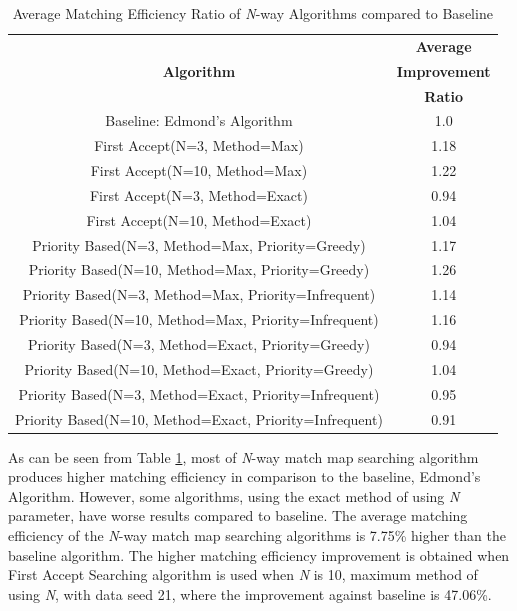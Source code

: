 \documentclass[conference]{IEEEtran}
\begin{document}
\begin{table}[htbp]
    \caption{Average Matching Efficiency Ratio of \textit{N}-way Algorithms compared to Baseline}
    \begin{center}
    \def\arraystretch{1.5}
    \begin{tabular}{|c|c|}
    \hline
    \cellcolor{tableheader}&\cellcolor{tableheader}\textbf{Average} \\
    \cellcolor{tableheader}\textbf{Algorithm}&\cellcolor{tableheader}\textbf{Improvement}\\
    \cellcolor{tableheader}&\cellcolor{tableheader}\textbf{Ratio}\\
    \hline
    Baseline: Edmond's Algorithm&1.0 \\
    \hline
    First Accept(N=3, Method=Max)&\cellcolor{moreratio}1.18 \\
    \hline
    First Accept(N=10, Method=Max)&\cellcolor{moreratio}1.22 \\
    \hline
    First Accept(N=3, Method=Exact)&\cellcolor{lessratio}0.94 \\
    \hline
    First Accept(N=10, Method=Exact)&\cellcolor{moreratio}1.04 \\
    \hline
    Priority Based(N=3, Method=Max, Priority=Greedy)&\cellcolor{moreratio}1.17 \\
    \hline
    Priority Based(N=10, Method=Max, Priority=Greedy)&\cellcolor{moreratio}1.26 \\
    \hline
    Priority Based(N=3, Method=Max, Priority=Infrequent)&\cellcolor{moreratio}1.14 \\
    \hline
    Priority Based(N=10, Method=Max, Priority=Infrequent)&\cellcolor{moreratio}1.16 \\
    \hline
    Priority Based(N=3, Method=Exact, Priority=Greedy)&\cellcolor{lessratio}0.94 \\
    \hline
    Priority Based(N=10, Method=Exact, Priority=Greedy)&\cellcolor{moreratio}1.04 \\
    \hline
    Priority Based(N=3, Method=Exact, Priority=Infrequent)&\cellcolor{lessratio}0.95 \\
    \hline
    Priority Based(N=10, Method=Exact, Priority=Infrequent)&\cellcolor{lessratio}0.91 \\
    \hline
    \end{tabular}
    \label{avgmatcheffratio}
    \end{center}
\end{table}

As can be seen from Table \ref{avgmatcheffratio}, most of \textit{N}-way match map searching algorithm produces higher matching efficiency in
comparison to the baseline, Edmond's Algorithm. However, some algorithms, using the exact method of using \textit{N} parameter,
have worse results compared to baseline. The average matching efficiency of the \textit{N}-way match map searching
algorithms is 7.75\% higher than the baseline algorithm. The higher matching efficiency improvement is obtained when First Accept
Searching algorithm is used when \textit{N} is 10, maximum method of using \textit{N}, with data seed 21, where the improvement
against baseline is 47.06\%.
\end{document}
